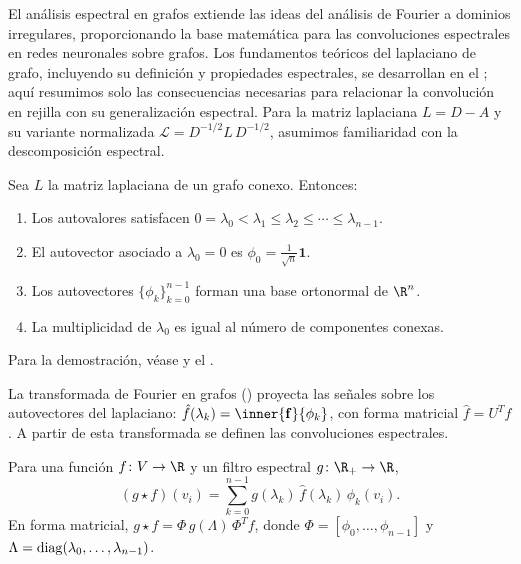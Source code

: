 El an\'alisis espectral en grafos extiende las ideas del an\'alisis de Fourier a
dominios irregulares, proporcionando la base matem\'atica para las convoluciones
espectrales en redes neuronales sobre grafos. Los fundamentos te\'oricos del
laplaciano de grafo, incluyendo su definici\'on y propiedades espectrales, se
desarrollan en el ; aqu\'i resumimos solo las consecuencias
necesarias para relacionar la convoluci\'on en rejilla con su generalizaci\'on
espectral. Para la matriz laplaciana $L = D - A$ y su variante normalizada
$\mathcal{L} = D^{-1/2} L\, D^{-1/2}$, asumimos familiaridad con la
descomposici\'on espectral.

\begin{theorem}
\label{thm:grids:spectral-laplacian}
Sea $L$ la matriz laplaciana de un grafo conexo. Entonces:
\begin{enumerate}
  \item Los autovalores satisfacen $0 = \lambda_0 < \lambda_1 \leq \lambda_2 \leq
    \cdots \leq \lambda_{n-1}$.
  \item El autovector asociado a $\lambda_0 = 0$ es
    $\phi_0 = \frac{1}{\sqrt{n}} \mathbf{1}$.
  \item Los autovectores $\{\phi_k\}_{k=0}^{n-1}$ forman una base ortonormal de
    $\R^n$.
  \item La multiplicidad de $\lambda_0$ es igual al n\'umero de componentes
    conexas.
\end{enumerate}
Para la demostraci\'on, v\'ease \citep[Cap\'itulos~1--2]{Chung1997} y el
.
\end{theorem}

La transformada de Fourier en grafos () proyecta las se\~nales
sobre los autovectores del laplaciano: $\hat{f}(\lambda_k) =
\inner{\mathbf{f}}{\phi_k}$, con forma matricial $\hat{f} = U^T f$. A partir de
esta transformada se definen las convoluciones espectrales.

\begin{definition}
\label{def:grids:spectral-conv-graphs}
Para una funci\'on $f \colon V \to \R$ y un filtro espectral
$g \colon \R_+ \to \R$,
\[
  (g \star f)(v_i) = \sum_{k=0}^{n-1} g(\lambda_k)\, \hat{f}(\lambda_k)\, \phi_k(v_i).
\]
En forma matricial, $g \star f = \Phi\, g(\Lambda)\, \Phi^T f$, donde
$\Phi = [\phi_0, \ldots, \phi_{n-1}]$ y
$\Lambda = \operatorname{diag}(\lambda_0, \ldots, \lambda_{n-1})$.
\end{definition}

